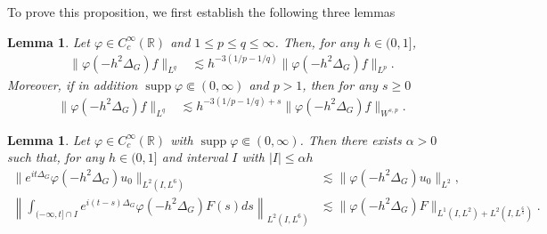 \documentclass[10pt%
]{amsart}
\numberwithin{equation}{section}
\newcommand{\R}{\mathbb{R}}
\newtheorem{lemma}[theorem]{Lemma}
\theoremstyle{definition}
\def\supp{\mathop{\mathrm{supp}}\nolimits}
\begin{document}

To prove this proposition, we first establish the following three lemmas

\begin{lemma}
	\label{lemma_CGT_1}
	Let $\varphi\in C_c^\infty(\R)$ and  $1\le p\le q\le \infty$. Then, for any $h\in (0,1]$, 
	\begin{align}
		\label{lemma_CGT_1_1}
		\|\varphi(-h^2\Delta_G)f\|_{L^q}&\lesssim h^{-3(1/p-1/q)}\|\varphi(-h^2\Delta_G)f\|_{L^{p}}. 
	\end{align}
	Moreover, if in addition $\supp \varphi\Subset (0,\infty)$ and $p>1$, then for any $s\ge0$
	\begin{align}
		\label{lemma_CGT_1_2}
		\|\varphi(-h^2\Delta_G)f\|_{L^q}&\lesssim h^{-3(1/p-1/q)+s}\|\varphi(-h^2\Delta_G)f\|_{W^{s,p}}. 
	\end{align}
\end{lemma}

\begin{lemma}
	\label{lemma_CGT_2}
	Let $\varphi\in C_c^\infty(\R)$ with $\mathop{\mathrm{supp}} \varphi\Subset (0,\infty)$. Then there exists $\alpha>0$ such that, for any $h\in (0,1]$ and interval $I$ with $|I|\le \alpha h$
	\begin{align*}
		\|e^{it\Delta_G}\varphi(-h^2\Delta_G)u_0\|_{L^2(I,L^6)}&\lesssim \|\varphi(-h^2\Delta_G)u_0\|_{L^2},\\
		\left\|\int_{(-\infty,t]\cap I} e^{i(t-s)\Delta_G}\varphi(-h^2\Delta_G)F(s)ds\right\|_{L^2(I,L^6)}
		&\lesssim \|\varphi(-h^2\Delta_G)F\|_{L^1(I,L^2)+L^2(I,L^{\frac 65})}. 
	\end{align*}
\end{lemma}
\end{document}
